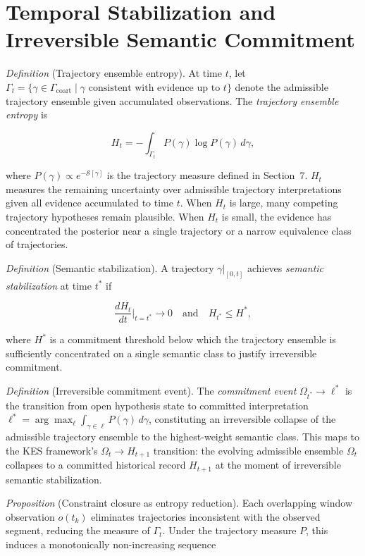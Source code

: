 \documentclass[11pt, a4paper]{article}
\theoremstyle{definition}
\begin{document}
\section{Temporal Stabilization and Irreversible Semantic Commitment}
\label{app:stabilization}

\textit{Definition} (Trajectory ensemble entropy). At time $t$, let $\Gamma_t = \{\gamma \in \Gamma_{\mathrm{coart}} \mid \gamma \text{ consistent with evidence up to } t\}$ denote the admissible trajectory ensemble given accumulated observations. The \emph{trajectory ensemble entropy} is

\[
H_t = -\int_{\Gamma_t} P(\gamma) \log P(\gamma)\, d\gamma,
\]

where $P(\gamma) \propto e^{-\mathcal{S}[\gamma]}$ is the trajectory measure defined in Section~7. $H_t$ measures the remaining uncertainty over admissible trajectory interpretations given all evidence accumulated to time $t$. When $H_t$ is large, many competing trajectory hypotheses remain plausible. When $H_t$ is small, the evidence has concentrated the posterior near a single trajectory or a narrow equivalence class of trajectories.

\textit{Definition} (Semantic stabilization). A trajectory $\gamma|_{[0,t]}$ achieves \emph{semantic stabilization} at time $t^*$ if

\[
\frac{dH_t}{dt}\bigg|_{t = t^*} \to 0 \quad \text{and} \quad H_{t^*} \leq H^\ast,
\]

where $H^\ast$ is a commitment threshold below which the trajectory ensemble is sufficiently concentrated on a single semantic class to justify irreversible commitment.

\textit{Definition} (Irreversible commitment event). The \emph{commitment event} $\Omega_{t^*} \to \ell^*$ is the transition from open hypothesis state to committed interpretation $\ell^* = \arg\max_\ell \int_{\gamma \in \ell} P(\gamma)\, d\gamma$, constituting an irreversible collapse of the admissible trajectory ensemble to the highest-weight semantic class. This maps to the KES framework's $\Omega_t \to H_{t+1}$ transition: the evolving admissible ensemble $\Omega_t$ collapses to a committed historical record $H_{t+1}$ at the moment of irreversible semantic stabilization.

\textit{Proposition} (Constraint closure as entropy reduction). Each overlapping window observation $o(t_k)$ eliminates trajectories inconsistent with the observed segment, reducing the measure of $\Gamma_t$. Under the trajectory measure $P$, this induces a monotonically non-increasing sequence
\end{document}
